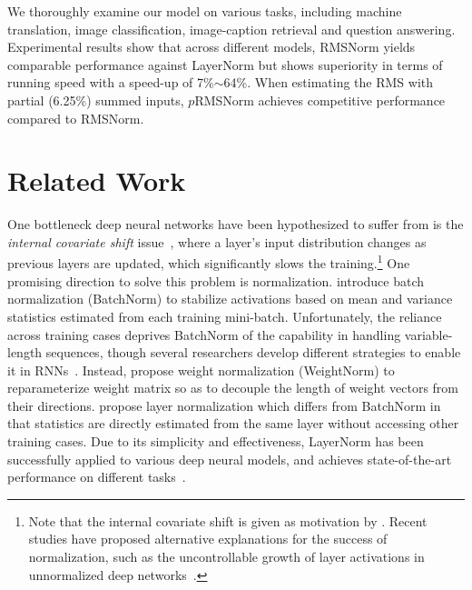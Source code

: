 \documentclass{article}
\begin{document}
We thoroughly examine our model on various tasks, including machine translation, image classification, image-caption retrieval and question answering. Experimental results show that across different models, RMSNorm yields comparable performance against LayerNorm but shows superiority in terms of running speed with a speed-up of 7\%$\sim$64\%. When estimating the RMS with partial (6.25\%) summed inputs, $p$RMSNorm achieves competitive performance compared to RMSNorm.


\section{Related Work}

One bottleneck deep neural networks have been hypothesized to suffer from is the \textit{internal covariate shift} issue~\cite{CIS-166708}, where a layer's input distribution changes as previous layers are updated, which significantly slows the training.\footnote{Note that the internal covariate shift is given as motivation by \cite{Ioffe:2015:BNA:3045118.3045167,ba2016layer}. Recent studies
have proposed alternative explanations for the success of normalization, such as the uncontrollable growth of layer activations in unnormalized deep networks~\cite{NIPS2018_7996}.} One promising direction to solve this problem is normalization. \citet{Ioffe:2015:BNA:3045118.3045167} introduce batch normalization (BatchNorm) to stabilize activations based on mean and variance statistics estimated from each training mini-batch. Unfortunately, the reliance across training cases deprives BatchNorm of the capability in handling variable-length sequences, though several researchers develop different strategies to enable it in RNNs~\cite{laurent2016batch,cooijmans2016recurrent}. Instead, \citet{NIPS2016_6114} propose weight normalization (WeightNorm) to reparameterize weight matrix so as to decouple the length of weight vectors from their directions. \citet{ba2016layer} propose layer normalization which differs from BatchNorm in that statistics are directly estimated from the same layer without accessing other training cases. Due to its simplicity and effectiveness, LayerNorm has been successfully applied to various deep neural models, and achieves state-of-the-art performance on different tasks~\cite{parmar2018image,zhou2018syllable,NIPS2017_7181,P18-1008}.
\end{document}
